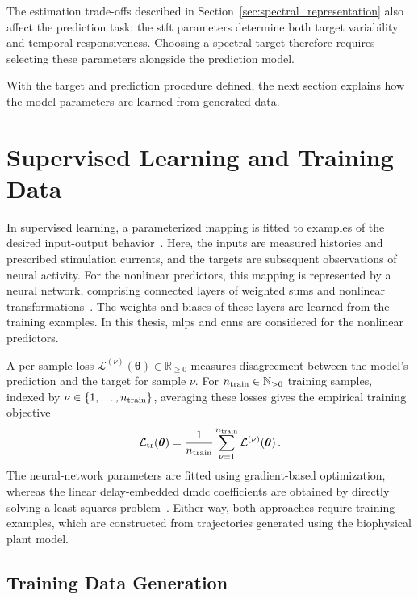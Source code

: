 The estimation trade-offs described in Section~\ref{sec:spectral_representation} also affect the prediction task: the \ac{stft} parameters determine both target variability and temporal responsiveness.
Choosing a spectral target therefore requires selecting these parameters alongside the prediction model.

With the target and prediction procedure defined, the next section explains how the model parameters are learned from generated data.

\section{Supervised Learning and Training Data}\label{sec:predictor_training}

In supervised learning, a parameterized mapping is fitted to examples of the desired input-output behavior~\cite{Goodfellow2016}.
Here, the inputs are measured histories and prescribed stimulation currents, and the targets are subsequent observations of neural activity.
For the nonlinear predictors, this mapping is represented by a neural network, comprising connected layers of weighted sums and nonlinear transformations~\cite{Goodfellow2016}.
The weights and biases of these layers are learned from the training examples.
In this thesis, \acp{mlp} and \acp{cnn} are considered for the nonlinear predictors.

A per-sample loss $\mathcal{L}^{(\nu)}(\boldsymbol{\theta})\in\mathbb{R}_{\geq 0}$ measures disagreement between the model's prediction and the target for sample $\nu$.
For $n_{\mathrm{train}}{}\in\mathbb{N}_{>0}$ training samples, indexed by $\nu\in\{1,\ldots,n_{\mathrm{train}}{}\}$, averaging these losses gives the empirical training objective
\begin{equation}
    \mathcal{L}_\mathrm{tr}(\boldsymbol{\theta})
    = \frac{1}{n_{\mathrm{train}}{}}
    \sum_{\nu=1}^{n_{\mathrm{train}}{}}
    \mathcal{L}^{(\nu)}(\boldsymbol{\theta})\,.
    \label{eq:empirical_predictor_loss}
\end{equation}
The neural-network parameters are fitted using gradient-based optimization, whereas the linear delay-embedded \ac{dmdc} coefficients are obtained by directly solving a least-squares problem~\cite{Goodfellow2016,Proctor2016}.
Either way, both approaches require training examples, which are constructed from trajectories generated using the biophysical plant model.

\subsection{Training Data Generation}

